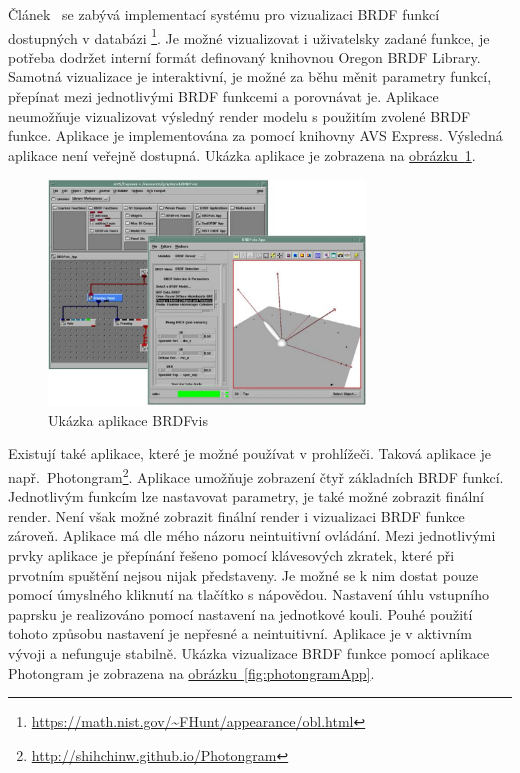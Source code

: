 \documentclass[czech,master]{diploma}
\newcommand{\appH}{6cm}
\begin{document}
Článek~\cite{brdfviz} se zabývá implementací systému pro vizualizaci BRDF funkcí dostupných v databázi \footnote{\url{https://math.nist.gov/~FHunt/appearance/obl.html}}. Je možné vizualizovat i uživatelsky zadané funkce, je potřeba dodržet interní formát definovaný knihovnou Oregon BRDF Library. Samotná vizualizace je interaktivní, je možné za běhu měnit parametry funkcí, přepínat mezi jednotlivými BRDF funkcemi a porovnávat je. Aplikace neumožňuje vizualizovat výsledný render modelu s použitím zvolené BRDF funkce. Aplikace je implementována za pomocí knihovny AVS Express. Výsledná aplikace není veřejně dostupná. Ukázka aplikace je zobrazena na \hyperref[fig:walkerBrdfApp]{obrázku~\ref{fig:walkerBrdfApp}}.\par

\begin{figure}[ht]
  \centering
  \includegraphics[height=\appH]{Figures/brdfvisWalker.png}
  \caption[Ukázka aplikace BRDFvis]{Ukázka aplikace BRDFvis~\cite{brdfviz}}%
  \label{fig:walkerBrdfApp}%
\end{figure}

Existují také aplikace, které je možné používat v prohlížeči. Taková aplikace je např.\ Photongram\footnote{\url{http://shihchinw.github.io/Photongram}}. Aplikace umožňuje zobrazení čtyř základních BRDF funkcí. Jednotlivým funkcím lze nastavovat parametry, je také možné zobrazit finální render. Není však možné zobrazit finální render i vizualizaci BRDF funkce zároveň. Aplikace má dle mého názoru neintuitivní ovládání. Mezi jednotlivými prvky aplikace je přepínání řešeno pomocí klávesových zkratek, které při prvotním spuštění nejsou nijak představeny. Je možné se k nim dostat pouze pomocí úmyslného kliknutí na tlačítko s nápovědou. Nastavení úhlu vstupního paprsku je realizováno pomocí nastavení na jednotkové kouli. Pouhé použití tohoto způsobu nastavení je nepřesné a neintuitivní. Aplikace je v aktivním vývoji a nefunguje stabilně. Ukázka vizualizace BRDF funkce pomocí aplikace Photongram je zobrazena na \hyperref[fig:photongramApp]{obrázku~\ref{fig:photongramApp}}.\par
\end{document}
